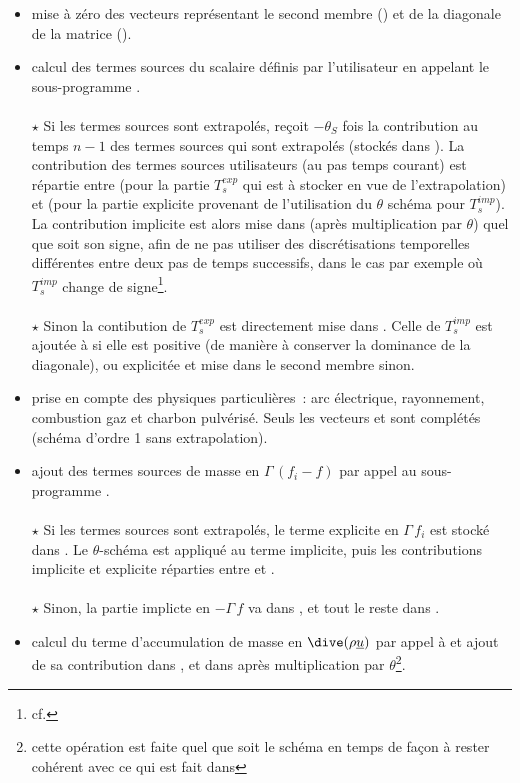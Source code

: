 \begin{itemize}
\item mise à zéro des vecteurs représentant le second membre () et
de la diagonale de la matrice ().
\item calcul des termes sources du scalaire définis par l'utilisateur en
appelant le sous-programme .
\\\\
$\star$ Si les termes sources sont extrapolés,  reçoit $-\theta_S$
fois la contribution au temps $n-1$ des termes sources qui sont extrapolés
(stockés dans ). La contribution des termes sources utilisateurs (au
pas temps courant) est répartie entre  (pour la partie $T_s^{exp}$
qui est à stocker en vue de l'extrapolation) et  (pour la partie
explicite provenant de l'utilisation du $\theta$ schéma pour $T_s^{imp}$). La
contribution implicite est alors mise dans  (après multiplication
par $\theta$) quel que soit son signe, afin de ne pas utiliser des
discrétisations temporelles différentes entre deux pas de temps successifs, dans
le cas par exemple où $T_s^{imp}$ change de signe\footnote{cf. }.
\\\\
$\star$ Sinon la contibution de $T_s^{exp}$ est directement mise dans
. Celle de $T_s^{imp}$ est ajoutée à  si elle est
positive (de manière à conserver la dominance de la diagonale), ou explicitée et
mise dans le second membre sinon.
\\
\item prise en compte des physiques particulières~: arc électrique, rayonnement,
combustion gaz et charbon pulvérisé. Seuls les vecteurs  et
 sont complétés (schéma d'ordre 1 sans extrapolation).
\item ajout des termes sources de masse en $\Gamma\,(f_i-f)$ par appel au sous-programme .
\\\\
$\star$ Si les termes sources sont extrapolés, le terme explicite en
$\Gamma\,f_i$ est stocké dans . Le $\theta$-schéma est appliqué au
terme implicite, puis les contributions implicite et explicite réparties entre
 et .
\\\\
$\star$ Sinon, la partie implicte en $-\Gamma\,f$ va dans , et tout le reste dans .
\\
\item calcul du terme d'accumulation de masse en $\dive(\rho \underline{u})$ par
appel à  et ajout de sa contribution dans , et dans
 après multiplication par $\theta$\footnote{cette opération est
faite quel que soit le schéma en temps de façon à rester cohérent avec ce qui
est fait dans }.


\end{itemize}
